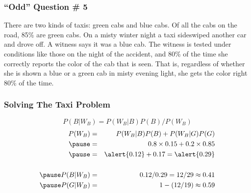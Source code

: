 \documentclass[handout]{beamer}
\begin{document}
\begin{frame}
\singlespacing
\frametitle{``Odd'' Question \# 5}


There are two kinds of taxis: green cabs and blue cabs. Of all the cabs on the road, \alert{85\% are green cabs}. On a misty winter night a taxi sideswiped another car and drove off. \alert{A witness says it was a blue cab.} The witness is tested under conditions like those on the night of the accident, and \alert{80\% of the time she correctly reports the color of the cab that is seen}. That is, regardless of whether she is shown a blue or a green cab in misty evening light, she gets the color right 80\% of the time. 

\vspace{1em}
\begin{center}
\end{center}

\end{frame}

\begin{frame}
\frametitle{Solving The Taxi Problem}
\footnotesize
{}
\normalsize

\vspace{1em}

\pause
$$P(B|W_B) = P(W_B|B)P(B)/P(W_B)$$
\pause
\begin{eqnarray*}
	P(W_B) &=& P(W_B|B) P(B) + P(W_B|G) P(G)\\ \pause
			&=& 0.8\times 0.15 + 0.2 \times 0.85 \\ \pause
			&=& \alert{0.12} + 0.17 = \alert{0.29}\\ \\ \pause
		P(B|W_B) &=& 0.12/0.29 = 12/29 \approx 0.41\\ \pause
		P(G|W_B) &=& 1 - (12/19) \approx 0.59 
	\end{eqnarray*}

\end{frame}
\end{document}
